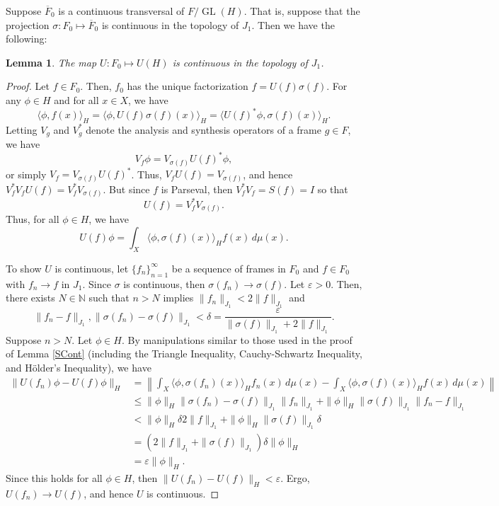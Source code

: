 \documentclass{article}
\newtheorem{lemma}[defn]{Lemma}
\newcommand{\GL}{\operatorname{GL}}
\newcommand{\Fbar}{\overline{F}}
\newcommand{\brak}[1]{\langle #1\rangle}
\newcommand{\eps}{\varepsilon}
\newcommand{\NN}{\mathbb{N}}
\begin{document}
Suppose $\Fbar_0$ is a continuous transversal of $F/\GL(H)$. That is, suppose that the projection $\sigma:F_0\mapsto\Fbar_0$ is continuous in the topology of $J_1$. Then we have the following:
\begin{lemma} \label{UCont}
The map $U:F_0\mapsto U(H)$ is continuous in the topology of $J_1$.
\end{lemma}
\begin{proof}
Let $f\in F_0$. Then, $f_0$ has the unique factorization $f = U(f)\sigma(f)$. For any $\phi\in H$ and for all $x\in X$, we have
\[ \brak{\phi, f(x)}_H = \brak{\phi, U(f)\sigma(f)(x)}_H
= \brak{U(f)^*\phi, \sigma(f)(x)}_H. \]
Letting $V_g$ and $V_g^*$ denote the analysis and synthesis operators of a frame $g\in F$, we have
\[ V_f\phi = V_{\sigma(f)}U(f)^*\phi, \]
or simply $V_f = V_{\sigma(f)}U(f)^*$. Thus, $V_fU(f) = V_{\sigma(f)}$, and hence $V_f^*V_fU(f) = V_f^*V_{\sigma(f)}$. But since $f$ is Parseval, then $V_f^*V_f = S(f)=I$ so that
\[ U(f) = V_f^* V_{\sigma(f)}. \]
Thus, for all $\phi\in H$, we have
\begin{equation}
U(f)\phi = \int_X\brak{\phi, \sigma(f)(x)}_H f(x)\,d\mu(x).
\end{equation}

To show $U$ is continuous, let $\{f_n\}_{n=1}^\infty$ be a sequence of frames in $F_0$ and $f\in F_0$ with $f_n\rightarrow f$ in $J_1$. Since $\sigma$ is continuous, then $\sigma(f_n)\rightarrow\sigma(f)$. Let $\eps>0$. Then, there exists $N\in\NN$ such that $n>N$ implies $\|f_n\|_{J_1}<2\|f\|_{J_1}$ and
\[ \|f_n-f\|_{J_1}, \|\sigma(f_n)-\sigma(f)\|_{J_1} < \delta = \frac{\eps}{\|\sigma(f)\|_{J_1}+2\|f\|_{J_1}}. \]
Suppose $n>N$. Let $\phi\in H$. By manipulations similar to those used in the proof of Lemma \ref{SCont} (including the Triangle Inequality, Cauchy-Schwartz Inequality, and H\"{o}lder's Inequality), we have
\begin{align*}
\|U(f_n)\phi-U(f)\phi\|_H
&= \left\|\int_X\brak{\phi, \sigma(f_n)(x)}_H f_n(x)\,d\mu(x) - \int_X\brak{\phi, \sigma(f)(x)}_H f(x)\,d\mu(x)\right\| \\
&\leq \|\phi\|_H \|\sigma(f_n)-\sigma(f)\|_{J_1}\|f_n\|_{J_1} + \|\phi\|_H \|\sigma(f)\|_{J_1} \|f_n-f\|_{J_1} \\
&< \|\phi\|_H \delta 2\|f\|_{J_1} + \|\phi\|_H \|\sigma(f)\|_{J_1} \delta \\
&= (2\|f\|_{J_1}+\|\sigma(f)\|_{J_1})\delta \|\phi\|_H \\
&= \eps \|\phi\|_H.
\end{align*}
Since this holds for all $\phi\in H$, then $\|U(f_n)-U(f)\|_H < \eps$. Ergo, $U(f_n)\rightarrow U(f)$, and hence $U$ is continuous.
\end{proof}
\end{document}
